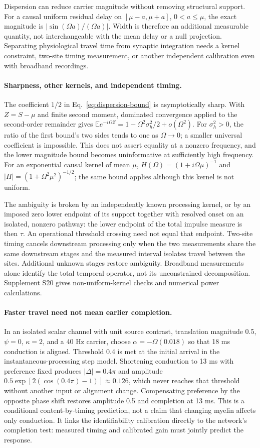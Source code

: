 Dispersion can reduce carrier magnitude without removing structural support. For a causal uniform residual delay on $[\mu-a,\mu+a]$, $0<a\le\mu$, the exact magnitude is $|\sin(\Omega a)/(\Omega a)|$. Width is therefore an additional measurable quantity, not interchangeable with the mean delay or a null projection. Separating physiological travel time from synaptic integration needs a kernel constraint, two-site timing measurement, or another independent calibration even with broadband recordings.

\paragraph{Sharpness, other kernels, and independent timing.} The coefficient $1/2$ in Eq.~\eqref{eq:dispersion-bound} is asymptotically sharp. With $Z=S-\mu$ and finite second moment, dominated convergence applied to the second-order remainder gives $\mathbb E e^{-i\Omega Z}=1-\Omega^2\sigma_h^2/2+o(\Omega^2)$. For $\sigma_h^2>0$, the ratio of the first bound's two sides tends to one as $\Omega\to0$; a smaller universal coefficient is impossible. This does not assert equality at a nonzero frequency, and the lower magnitude bound becomes uninformative at sufficiently high frequency. For an exponential causal kernel of mean $\mu$, $H(\Omega)=(1+i\Omega\mu)^{-1}$ and $|H|=(1+\Omega^2\mu^2)^{-1/2}$; the same bound applies although this kernel is not uniform.

The ambiguity is broken by an independently known processing kernel, or by an imposed zero lower endpoint of its support together with resolved onset on an isolated, nonzero pathway: the lower endpoint of the total impulse measure is then $\tau$. An operational threshold crossing need not equal that endpoint. Two-site timing cancels downstream processing only when the two measurements share the same downstream stages and the measured interval isolates travel between the sites. Additional unknown stages restore ambiguity. Broadband measurements alone identify the total temporal operator, not its unconstrained decomposition. Supplement S20 gives non-uniform-kernel checks and numerical power calculations.

\paragraph{Faster travel need not mean earlier completion.} In an isolated scalar channel with unit source contrast, translation magnitude 0.5, $\psi=0$, $\kappa=2$, and a 40 Hz carrier, choose $\alpha=-\Omega(0.018)$ so that 18 ms conduction is aligned. Threshold 0.4 is met at the initial arrival in the instantaneous-processing step model. Shortening conduction to 13 ms with preference fixed produces $|\Delta|=0.4\pi$ and amplitude $0.5\exp[2(\cos(0.4\pi)-1)]\approx0.126$, which never reaches that threshold without another input or alignment change. Compensating preference by the opposite phase shift restores amplitude 0.5 and completion at 13 ms. This is a conditional content-by-timing prediction, not a claim that changing myelin affects only conduction. It links the identifiability calibration directly to the network's completion test: measured timing and calibrated gain must jointly predict the response.

